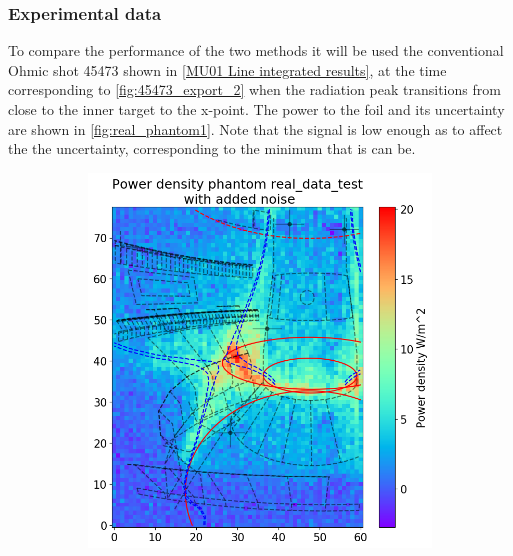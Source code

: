 \subsubsection{Experimental data}\label{Experimental data}

To compare the performance of the two methods it will be used the conventional Ohmic shot 45473 shown in \autoref{MU01 Line integrated results}, at the time corresponding to \autoref{fig:45473_export_2} when the radiation peak transitions from close to the inner target to the x-point. The power to the foil and its uncertainty are shown in \autoref{fig:real_phantom1}. Note that the signal is low enough as to affect the the uncertainty, corresponding to the minimum that is can be.


\begin{figure}
     \begin{subfigure}{0.45\linewidth}
         \centering
         \includegraphics[trim={0 0 0 45},clip,width=\textwidth]{Chapters/chapter2/figs/inversion_comparison_foil_power_real_data_test.png}
         \caption{}
         \label{fig:real_phantom1a}
     \end{subfigure}
     \hfill
     \begin{subfigure}{0.45\linewidth}

\end{subfigure}
\end{figure}
